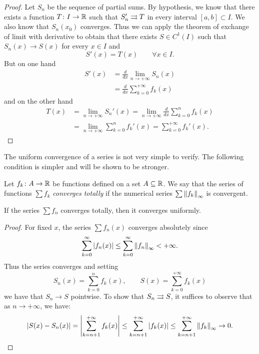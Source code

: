 \begin{proof}
\mymark{**}
Let $S_n$ be the sequence of partial sums. By hypothesis, we know that there
exists a function $T\colon I \to {\mathbb R}$ such that $S_n' \rightrightarrows T$ in every interval
$[a,b]\subset I$. We also know that $S_n(x_0)$ converges. Thus we can apply the
theorem of exchange of limit with derivative to obtain that there exists $S\in
C^1(I)$ such that $S_n(x)\to S(x)$ for every $x\in I$ and
\[
   S'(x) = T(x) \qquad \forall x\in I.
\]
But on one hand
\begin{align*}
S'(x)
&= \frac{d}{dx} \lim_{n\to +\infty} S_n(x) \\
&= \frac{d}{dx} \sum_{k=0}^{+\infty} f_k(x)
\end{align*}
and on the other hand
\begin{align*}
T(x)
&= \lim_{n\to +\infty} S_n'(x)
 = \lim_{n\to +\infty} \frac{d}{dx} \sum_{k=0}^n f_k(x) \\
&= \lim_{n\to +\infty} \sum_{k=0}^n f_k'(x)
 = \sum_{k=0}^{+\infty} f_k'(x).
\end{align*}
\end{proof}

The uniform convergence of a series is not very simple to verify. The following
condition is simpler and will be shown to be stronger.

\begin{definition}
\mymark{***}
Let $f_k\colon A \to {\mathbb R}$ be functions defined on a set $A\subseteq {\mathbb R}$. We say
that the series of functions $\sum f_k$ \emph{converges totally}%
%
%
if the numerical series $\sum {\left\Vert f_k\right\Vert}_\infty$ is convergent.
\end{definition}

\begin{theorem}
\mymark{***}
If the series $\sum f_n$ converges totally, then it converges uniformly.
\end{theorem}
%
\begin{proof}
\mymark{***}
For fixed $x$, the series $\sum f_n(x)$ converges absolutely since
\[
  \sum_{k=0}^\infty {\left|f_n(x)\right|}
  \le \sum_{k=0}^\infty {\left\Vert f_n\right\Vert}_\infty < +\infty.
\]
Thus the series converges and setting
\[
  S_n(x) = \sum_{k=0}^n f_k(x), \qquad
  S(x) = \sum_{k=0}^{+\infty} f_k(x)
\]
we have that $S_n\to S$ pointwise. To show that $S_n \rightrightarrows S$, it suffices to
observe that as $n\to +\infty$, we have:
\[
  {\left|S(x) - S_n(x)\right|}
  = {\left|\sum_{k=n+1}^{+\infty} f_k(x)\right|}
  \le \sum_{k=n+1}^{+\infty}{\left|f_k(x)\right|}
  \le \sum_{k=n+1}^{+\infty}{\left\Vert f_k\right\Vert}_\infty \to 0.
\]
\end{proof}


